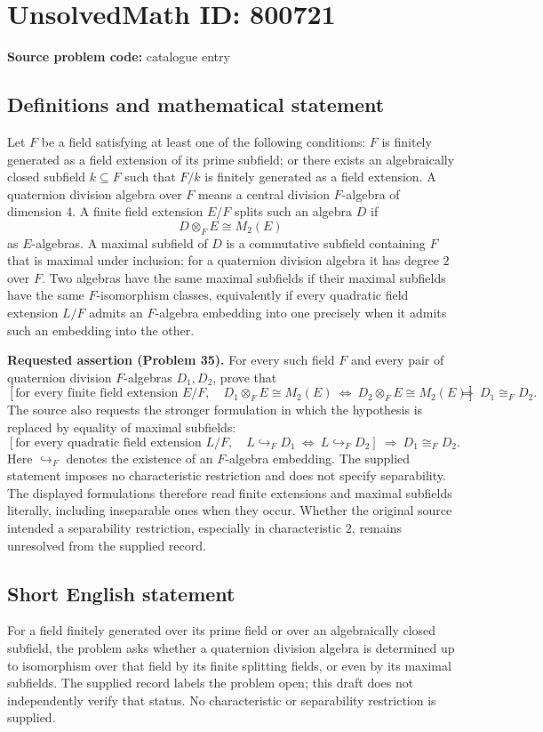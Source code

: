 \documentclass[11pt]{article}
\begin{document}
\section*{UnsolvedMath ID: 800721}
\textbf{Source problem code:} catalogue entry
\subsection{Definitions and mathematical statement}
Let \(F\) be a field satisfying at least one of the following conditions: \(F\) is finitely generated as a field extension of its prime subfield; or there exists an algebraically closed subfield \(k\subseteq F\) such that \(F/k\) is finitely generated as a field extension. A quaternion division algebra over \(F\) means a central division \(F\)-algebra of dimension \(4\). A finite field extension \(E/F\) splits such an algebra \(D\) if
\[
D\otimes_F E\cong M_2(E)
\]
as \(E\)-algebras. A maximal subfield of \(D\) is a commutative subfield containing \(F\) that is maximal under inclusion; for a quaternion division algebra it has degree \(2\) over \(F\). Two algebras have the same maximal subfields if their maximal subfields have the same \(F\)-isomorphism classes, equivalently if every quadratic field extension \(L/F\) admits an \(F\)-algebra embedding into one precisely when it admits such an embedding into the other.

\textbf{Requested assertion (Problem 35).} For every such field \(F\) and every pair of quaternion division \(F\)-algebras \(D_1,D_2\), prove that
\[
\left[\text{for every finite field extension }E/F,\quad
D_1\otimes_F E\cong M_2(E)
\ \Longleftrightarrow\ 
D_2\otimes_F E\cong M_2(E)\right]
\ \Longrightarrow\ D_1\cong_F D_2.
\]
The source also requests the stronger formulation in which the hypothesis is replaced by equality of maximal subfields:
\[
\left[\text{for every quadratic field extension }L/F,\quad
L\hookrightarrow_F D_1\ \Longleftrightarrow\ L\hookrightarrow_F D_2\right]
\ \Longrightarrow\ D_1\cong_F D_2.
\]
Here \(\hookrightarrow_F\) denotes the existence of an \(F\)-algebra embedding. The supplied statement imposes no characteristic restriction and does not specify separability. The displayed formulations therefore read finite extensions and maximal subfields literally, including inseparable ones when they occur. Whether the original source intended a separability restriction, especially in characteristic \(2\), remains unresolved from the supplied record.
\subsection{Short English statement}
For a field finitely generated over its prime field or over an algebraically closed subfield, the problem asks whether a quaternion division algebra is determined up to isomorphism over that field by its finite splitting fields, or even by its maximal subfields. The supplied record labels the problem open; this draft does not independently verify that status. No characteristic or separability restriction is supplied.
\end{document}
